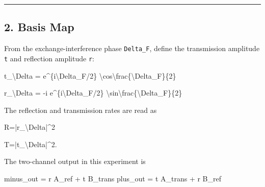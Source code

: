 \documentclass[
]{article}
\newenvironment{Shaded}{}{}
\newcommand{\NormalTok}[1]{#1}
\begin{document}
\begin{center}\rule{0.5\linewidth}{0.5pt}\end{center}

\subsection{2. Basis Map}\label{basis-map}

From the exchange-interference phase \texttt{Delta\_F}, define the
transmission amplitude \texttt{t} and reflection amplitude \texttt{r}:

\begin{Shaded}
\begin{Highlighting}[]
\NormalTok{t\_\textbackslash{}Delta}
\NormalTok{=}
\NormalTok{e\^{}\{i\textbackslash{}Delta\_F/2\}}
\NormalTok{\textbackslash{}cos\textbackslash{}frac\{\textbackslash{}Delta\_F\}\{2\}}
\end{Highlighting}
\end{Shaded}

\begin{Shaded}
\begin{Highlighting}[]
\NormalTok{r\_\textbackslash{}Delta}
\NormalTok{=}
\NormalTok{{-}i e\^{}\{i\textbackslash{}Delta\_F/2\}}
\NormalTok{\textbackslash{}sin\textbackslash{}frac\{\textbackslash{}Delta\_F\}\{2\}}
\end{Highlighting}
\end{Shaded}

The reflection and transmission rates are read as

\begin{Shaded}
\begin{Highlighting}[]
\NormalTok{R=|r\_\textbackslash{}Delta|\^{}2}
\end{Highlighting}
\end{Shaded}

\begin{Shaded}
\begin{Highlighting}[]
\NormalTok{T=|t\_\textbackslash{}Delta|\^{}2.}
\end{Highlighting}
\end{Shaded}

The two-channel output in this experiment is

\begin{Shaded}
\begin{Highlighting}[]
\NormalTok{minus\_out = r A\_ref + t B\_trans}
\NormalTok{plus\_out  = t A\_trans + r B\_ref}
\end{Highlighting}
\end{Shaded}
\end{document}
